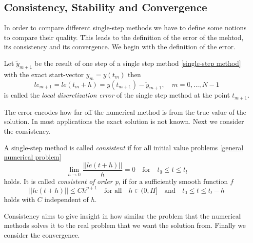 	\subsection{Consistency, Stability and Convergence}
	
	In order to compare different single-step methods we have to define some notions to compare their quality. This leads to the definition of the error of the mehtod, its consistency and its convergence. We begin with the definition of the error.
	
	\begin{definition}\label{Discretization_Error_SingleStep}
		Let $\tilde{y}_{m+1}$ be the result of one step of a single step method \eqref{single-step method} with the exact start-vector $y_m = y(t_m)$ then
		\begin{equation}
			\label{local discretization error single step}
			le_{m+1} = le(t_m+h) = y(t_{m+1}) - \tilde{y}_{m+1}, \quad m = 0,...,N-1
		\end{equation}
		is called the \emph{local discretization error} of the single step method at the point $t_{m+1}$.
	\end{definition}

	The error encodes how far off the numerical method is from the true value of the solution. In most applications the exact solution is not known. Next we consider the consistency.

	\begin{definition}\label{Consistency_SingleStep}
		A single-step method is called \emph{consistent} if for all initial value problems \eqref{general numerical problem} 
		\begin{equation}
			\lim\limits_{h \to 0} \frac{||le(t+h)||}{h} = 0 \quad \text{for} \quad t_0 \leq t \leq t_l
		\end{equation}
		holds.\newline
		It is called \emph{consistent of order p}, if for a sufficiently smooth function $f$
		\begin{equation}
			||le(t+h)|| \leq Ch^{p+1} \quad \text{for all} \quad h \in \mathopen{(} 0,H \mathclose{]} \quad \text{and} \quad t_0 \leq t \leq t_l - h
		\end{equation}
		holds with $C$ independent of $h$.
	\end{definition}

	Consistency aims to give insight in how similar the problem that the numerical methods solves it to the real problem that we want the solution from. Finally we consider the convergence.

